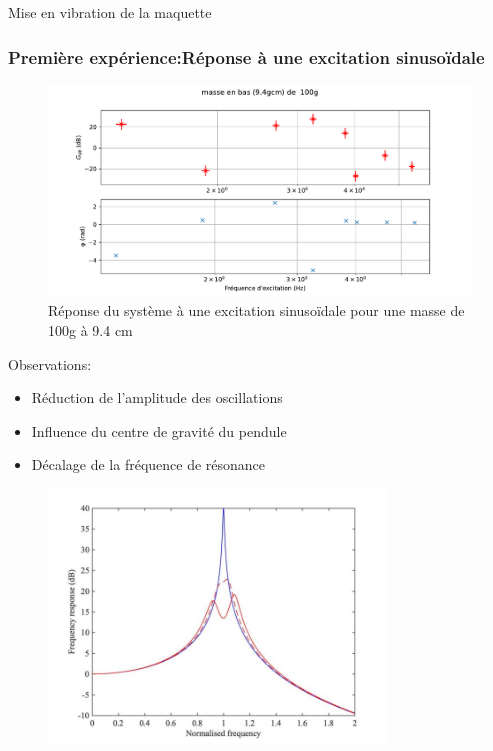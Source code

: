 \documentclass{beamer}
\begin{document}
	\begin{frame}{Mise en vibration de la maquette}
		\frametitle{Première expérience:Réponse à une excitation sinusoïdale}
		\centering
		\begin{figure}
			
		
		\includegraphics[scale=0.34]{Image/masse_en_bas_(9.4gcm)_de__100g.pdf}
	\caption{Réponse du système à une excitation sinusoïdale pour une masse de 100g à 9.4 cm }
	\end{figure}
\end{frame}
	\begin{frame}
		
		Observations:
		\begin{itemize}
			\item Réduction de l'amplitude des oscillations
			\item Influence du centre de gravité du pendule
			\item Décalage de la fréquence de résonance  
		\end{itemize}
		
	\end{frame}
	
	\begin{frame}{}
		\begin{figure}
			\includegraphics[width=0.8\textwidth]{Image/Objectif en courbe.jpg}
		\end{figure}
	\end{frame}	
\end{document}
